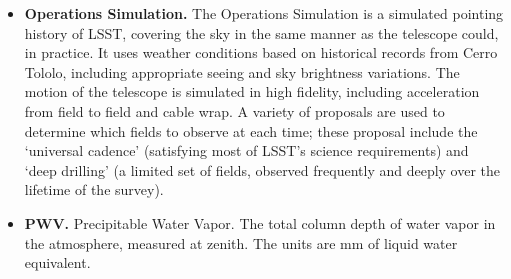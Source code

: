 \documentclass[12pt,preprint]{aastex}
\begin{document}
\begin{itemize}
\item{{\bf Operations Simulation.} The Operations Simulation is a
simulated pointing history of LSST, covering the sky in the same
manner as the telescope could, in practice. It uses weather conditions
based on historical records from Cerro Tololo, including appropriate
seeing and sky brightness variations. The motion of the telescope is
simulated in high fidelity, including acceleration from field to field
and cable wrap.  A variety of proposals are used to determine which
fields to observe at each time; these proposal include the `universal
cadence' (satisfying most of LSST's science requirements) and `deep
drilling' (a limited set of fields, observed frequently and deeply
over the lifetime of the survey). }

\item{{\bf PWV.} Precipitable Water Vapor.  The total column depth of water vapor in the atmosphere, measured 
at zenith.  The units are mm of liquid water equivalent. }

\end{itemize}
\end{document}
